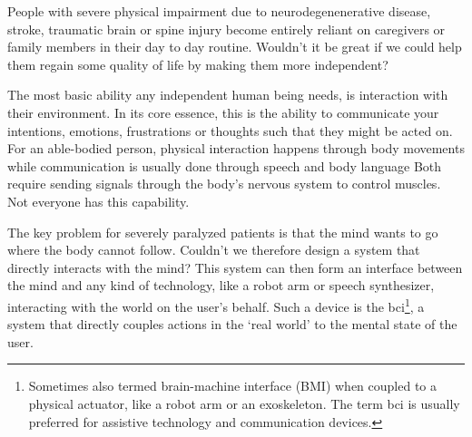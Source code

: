 \the\textwidth

People with severe physical impairment due to
neurodegenenerative disease, stroke, traumatic brain or spine injury
become entirely reliant on caregivers or family members in their day to day
routine.
Wouldn't it be great if we could help them regain some quality of life by
making them more independent?

The most basic ability any independent human being needs, is interaction with
their environment.
In its core essence, this is the ability to communicate your intentions,
emotions, frustrations or thoughts such that they might be acted on.
For an able-bodied person, physical interaction happens through body movements
while communication is usually done through speech and body language
Both require sending signals through the body's nervous system to control
muscles.
Not everyone has this capability.

The key problem for severely paralyzed patients is that the mind wants to go
where the body cannot follow.
Couldn't we therefore design a system that directly interacts with the mind?
This system can then form an interface between the mind and any kind of
technology, like a robot arm or speech synthesizer, interacting with the world
on the user's behalf.
Such a device is the \ac{bci}\footnote{Sometimes also
termed brain-machine interface (BMI) when coupled to a physical actuator, like
a robot arm or an exoskeleton.
The term \ac{bci} is usually preferred for
assistive technology and communication devices.
},
a system that directly couples actions in the `real world' to the mental state of
the user.

